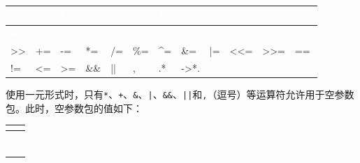 \myTableBegin
\begin{xltabular}{\textwidth}{|>{\hsize\raggedright\arraybackslash}X|>{\hsize\raggedright\arraybackslash}X|>{\hsize\raggedright\arraybackslash}X|>{\hsize\raggedright\arraybackslash}X|>{\hsize\raggedright\arraybackslash}X|>{\hsize\raggedright\arraybackslash}X|>{\hsize\raggedright\arraybackslash}X|>{\hsize\raggedright\arraybackslash}X|>{\hsize\raggedright\arraybackslash}X|>{\hsize\raggedright\arraybackslash}X|>{\hsize\raggedright\arraybackslash}X|>{\hsize\raggedright\arraybackslash}X|}
\hline
{} \textcolor{white}{\textbf{+}} & \textcolor{white}{\textbf{-}} & \textcolor{white}{\textbf{*}} & \textcolor{white}{\textbf{/}} & \textcolor{white}{\textbf{\%}} & \textcolor{white}{\textbf{\textasciicircum{}}} & \textcolor{white}{\textbf{\&}} & \textcolor{white}{\textbf{|}} & \textcolor{white}{\textbf{=}} & \textcolor{white}{\textbf{<}} & \textcolor{white}{\textbf{>}} & \textcolor{white}{\textbf{<<}} \\
\hline
\endfirsthead
{} \textcolor{white}{\textbf{+}} & \textcolor{white}{\textbf{-}} & \textcolor{white}{\textbf{*}} & \textcolor{white}{\textbf{/}} & \textcolor{white}{\textbf{\%}} & \textcolor{white}{\textbf{\textasciicircum{}}} & \textcolor{white}{\textbf{\&}} & \textcolor{white}{\textbf{|}} & \textcolor{white}{\textbf{=}} & \textcolor{white}{\textbf{<}} & \textcolor{white}{\textbf{>}} & \textcolor{white}{\textbf{<<}} \\
\hline
\endhead
>> & += & -= & *= & /= & \%= & \textasciicircum{}= & \&= & |= & <<= & >>= & == \\
\hline
!= & <= & >= & \&\& & || & , & .* & ->*. &  &  &  &  \\
\hline
\end{xltabular}
\myTableEnd



使用一元形式时，只有\texttt{*}、\texttt{+}、\texttt{\&}、\texttt{|}、\texttt{\&\&}、\texttt{||}和\texttt{,}（逗号）等运算符允许用于空参数包。此时，空参数包的值如下：



\myTableBegin
\begin{xltabular}{\textwidth}{|>{\hsize\raggedright\arraybackslash}X|>{\hsize\raggedright\arraybackslash}X|}
\hline
{} \textcolor{white}{\myttbr{+}} & \textcolor{white}{} \\
\hline
\endfirsthead
{} \textcolor{white}{\myttbr{+}} & \textcolor{white}{} \\
\hline
\endhead
\myttbr{*} &  \\
\hline
\myttbr{\&} &  \\
\hline
\myttbr{|} &  \\
\hline
\myttbr{\&\&} &  \\
\hline
\myttbr{||} &  \\
\hline
\myttbr{,} &  \\
\hline
\end{xltabular}
\myTableEnd


